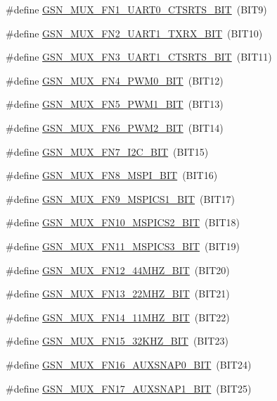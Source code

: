 \begin{DoxyCompactItemize}
\item 
\#define \hyperlink{a00546_a53aebca4d854c2382b9963eb743122ae}{GSN\_\-MUX\_\-FN1\_\-UART0\_\-CTSRTS\_\-BIT}~(BIT9)
\item 
\#define \hyperlink{a00546_a4031432d667ab0771290bfb647eaf11c}{GSN\_\-MUX\_\-FN2\_\-UART1\_\-TXRX\_\-BIT}~(BIT10)
\item 
\#define \hyperlink{a00546_aeb849952d1631fe0556a334f67e36077}{GSN\_\-MUX\_\-FN3\_\-UART1\_\-CTSRTS\_\-BIT}~(BIT11)
\item 
\#define \hyperlink{a00546_a7f4b2abe933a45381f428ad2bc5cc728}{GSN\_\-MUX\_\-FN4\_\-PWM0\_\-BIT}~(BIT12)
\item 
\#define \hyperlink{a00546_af23c44efdd7e700be60fb4a3c9fdf25e}{GSN\_\-MUX\_\-FN5\_\-PWM1\_\-BIT}~(BIT13)
\item 
\#define \hyperlink{a00546_aee644fa9a1d55703a44ba429a9da380e}{GSN\_\-MUX\_\-FN6\_\-PWM2\_\-BIT}~(BIT14)
\item 
\#define \hyperlink{a00546_a2ca9c1f769bf59aa63b1f26818f061e6}{GSN\_\-MUX\_\-FN7\_\-I2C\_\-BIT}~(BIT15)
\item 
\#define \hyperlink{a00546_a85a4ab9c4f0c550e88fd9510e435889d}{GSN\_\-MUX\_\-FN8\_\-MSPI\_\-BIT}~(BIT16)
\item 
\#define \hyperlink{a00546_a58aa7fc2c22534cbe838de6ba03ce191}{GSN\_\-MUX\_\-FN9\_\-MSPICS1\_\-BIT}~(BIT17)
\item 
\#define \hyperlink{a00546_aba300ad1edca0c790397de9dd5876e12}{GSN\_\-MUX\_\-FN10\_\-MSPICS2\_\-BIT}~(BIT18)
\item 
\#define \hyperlink{a00546_af1752c51ad8586bc63e080574853b9b1}{GSN\_\-MUX\_\-FN11\_\-MSPICS3\_\-BIT}~(BIT19)
\item 
\#define \hyperlink{a00546_aade9d6eff1cd105a5137d5ff07f8cef2}{GSN\_\-MUX\_\-FN12\_\-44MHZ\_\-BIT}~(BIT20)
\item 
\#define \hyperlink{a00546_a513d38eb9a7a5ef154edbbb97d9398ee}{GSN\_\-MUX\_\-FN13\_\-22MHZ\_\-BIT}~(BIT21)
\item 
\#define \hyperlink{a00546_a6438c22023e9b21cba0a836855490c94}{GSN\_\-MUX\_\-FN14\_\-11MHZ\_\-BIT}~(BIT22)
\item 
\#define \hyperlink{a00546_ae8c413f0275f99cd2f10a5f2cad79733}{GSN\_\-MUX\_\-FN15\_\-32KHZ\_\-BIT}~(BIT23)
\item 
\#define \hyperlink{a00546_a1d2009d2eeb7cae20d0bcab8c9cae922}{GSN\_\-MUX\_\-FN16\_\-AUXSNAP0\_\-BIT}~(BIT24)
\item 
\#define \hyperlink{a00546_af6cd23b5728c77f1cdf2127bc5075e1d}{GSN\_\-MUX\_\-FN17\_\-AUXSNAP1\_\-BIT}~(BIT25)

\end{DoxyCompactItemize}
